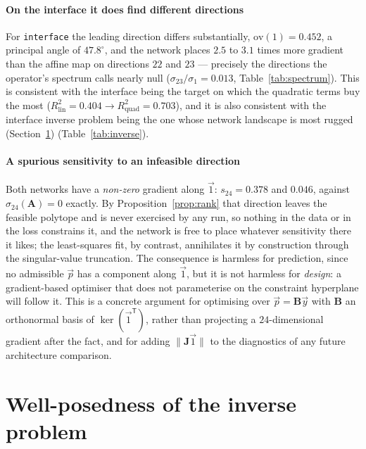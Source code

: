 \documentclass[11pt,a4paper]{article}
\newcommand{\vect}[1]{\mathbf{#1}}
\theoremstyle{plain}
\theoremstyle{definition}
\theoremstyle{remark}
\begin{document}
\label{meas:active-int}
\paragraph{On the interface it does find different directions}
For \texttt{interface} the leading direction differs substantially,
$\mathrm{ov}(1) = 0.452$, a principal angle of $47.8^\circ$, and the network
places $2.5$ to $3.1$ times more gradient than the affine map on directions
$22$ and $23$ --- precisely the directions the operator's spectrum calls nearly
null ($\sigma_{23}/\sigma_1 = 0.013$, Table~\ref{tab:spectrum}). This is
consistent with the interface being the target on which the quadratic terms buy
the most ($R^2_{\mathrm{lin}} = 0.404 \to R^2_{\mathrm{quad}} = 0.703$), and it
is also consistent with the interface inverse problem being the one whose
network landscape is most rugged (Section~\ref{sec:inverse})
(Table~\ref{tab:inverse}).

\label{rem:spurious}
\paragraph{A spurious sensitivity to an infeasible direction}
Both networks have a \emph{non-zero} gradient along $\vec{1}$: $s_{24} = 0.378$
and $0.046$, against $\sigma_{24}(\vect{A}) = 0$ exactly. By
Proposition~\ref{prop:rank} that direction leaves the feasible
polytope and is never exercised by any run, so nothing in the data or
in the loss constrains it, and the network is free to place whatever
sensitivity there it likes; the least-squares fit, by contrast, annihilates it
by construction through the singular-value truncation. The consequence is
harmless for prediction, since no admissible $\vec{p}$ has a component along
$\vec{1}$, but it is not harmless for \emph{design}: a gradient-based optimiser
that does not parameterise on the constraint hyperplane will follow it. This is
a concrete argument for optimising over $\vec{p} = \vect{B}\vec{y}$ with
$\vect{B}$ an orthonormal basis of $\ker(\vec{1}^{\mathsf{T}})$, rather than
projecting a $24$-dimensional gradient after the fact, and for adding
$\|\vect{J}\vec{1}\|$ to the diagnostics of any future architecture comparison.

\section{Well-posedness of the inverse problem}
\label{sec:inverse}
\end{document}
